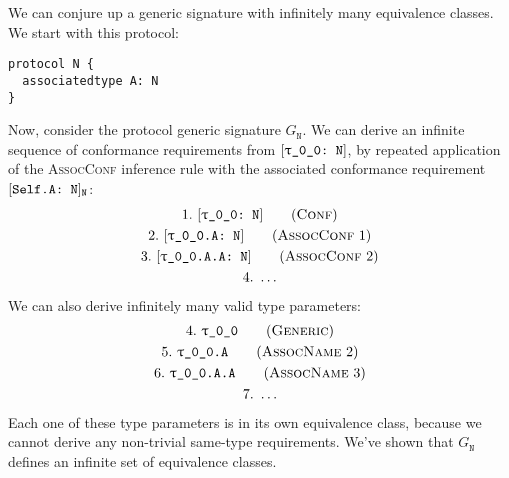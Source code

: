 \documentclass[../generics]{subfiles}
\begin{document}
\begin{example}\label{protocol n example}
We can conjure up a generic signature with infinitely many equivalence classes. We start with this protocol:
\begin{Verbatim}
protocol N {
  associatedtype A: N
}
\end{Verbatim}
Now, consider the protocol generic signature $G_\texttt{N}$. We can derive an infinite sequence of conformance requirements from $[\texttt{\texttt{$\uptau$\_0\_0}:~N}]$, by repeated application of the \textsc{AssocConf} inference rule with the associated conformance requirement $[\texttt{Self.A:~N}]_\texttt{N}$:
\begin{gather*}
\ConfStep{\rT}{N}{1}\\
\AssocConfStep{1}{\rT.A}{N}{2}\\
\AssocConfStep{2}{\rT.A.A}{N}{3}\\
4.\ \ldots
\end{gather*}
We can also derive infinitely many valid type parameters:
\begin{gather*}
\GenericStep{\rT}{4}\\
\AssocNameStep{2}{\rT.A}{5}\\
\AssocNameStep{3}{\rT.A.A}{6}\\
7.\ \ldots
\end{gather*}
Each one of these type parameters is in its own equivalence class, because we cannot derive any non-trivial same-type requirements. We've shown that $G_\texttt{N}$ defines an infinite set of equivalence classes.
\end{example}
\end{document}
